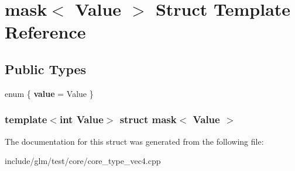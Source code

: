 \hypertarget{structmask}{\section{mask$<$ \-Value $>$ \-Struct \-Template \-Reference}
\label{structmask}
}
\subsection*{\-Public \-Types}
\begin{DoxyCompactItemize}
\item 
enum \{ {\bfseries value} =  \-Value
 \}
\end{DoxyCompactItemize}
\subsubsection*{template$<$int \-Value$>$ struct mask$<$ Value $>$}



\-The documentation for this struct was generated from the following file\-:\begin{DoxyCompactItemize}
\item 
include/glm/test/core/core\-\_\-type\-\_\-vec4.\-cpp\end{DoxyCompactItemize}
